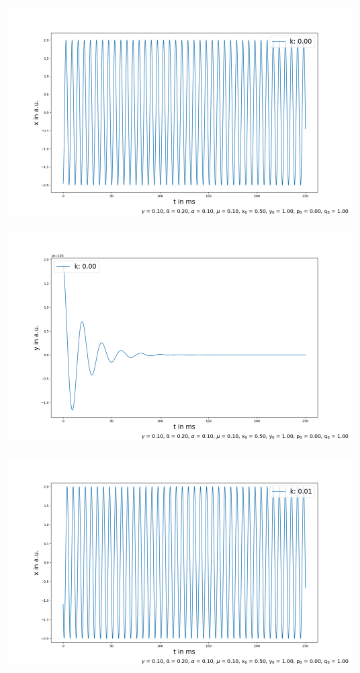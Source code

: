 \documentclass[oneside,10pt,a4paper]{report}
\begin{document}
		
		\begin{figure}[H]
			\centering
			\begin{subfigure}[b]{0.45\textwidth}
				\includegraphics[width=\textwidth]{x_k1.png}
				\caption{}
				\label{fig:x1}
			\end{subfigure}
			\hfill
			\begin{subfigure}[b]{0.45\textwidth}
				\includegraphics[width=\textwidth]{y_k1.png}
				\caption{}
				\label{fig: y1}
			\end{subfigure}
				\begin{subfigure}[b]{0.45\textwidth}
				\includegraphics[width=\textwidth]{x_k5.png}

\end{subfigure}
\end{figure}
\end{document}

